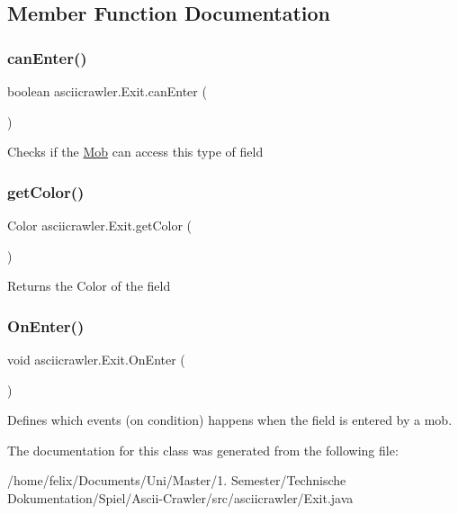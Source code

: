 \subsection{Member Function Documentation}
\mbox{\label{classasciicrawler_1_1Exit_a38b93acb30670f4f4ba1c3059e0bbfa0}} 
\subsubsection{\texorpdfstring{can\+Enter()}{canEnter()}}
{\footnotesize\ttfamily boolean asciicrawler.\+Exit.\+can\+Enter (\begin{DoxyParamCaption}{ }\end{DoxyParamCaption})\hspace{0.3cm}{\ttfamily [inline]}}

Checks if the \hyperlink{classasciicrawler_1_1Mob}{Mob} can access this type of field \mbox{\label{classasciicrawler_1_1Exit_a846df814b72bfab477c524427570d0cd}} 
\subsubsection{\texorpdfstring{get\+Color()}{getColor()}}
{\footnotesize\ttfamily Color asciicrawler.\+Exit.\+get\+Color (\begin{DoxyParamCaption}{ }\end{DoxyParamCaption})\hspace{0.3cm}{\ttfamily [inline]}}

Returns the Color of the field \mbox{\label{classasciicrawler_1_1Exit_adaf13dd0b5f3bb6cf25230da9dc166bc}} 
\subsubsection{\texorpdfstring{On\+Enter()}{OnEnter()}}
{\footnotesize\ttfamily void asciicrawler.\+Exit.\+On\+Enter (\begin{DoxyParamCaption}{ }\end{DoxyParamCaption})\hspace{0.3cm}{\ttfamily [inline]}}

Defines which events (on condition) happens when the field is entered by a mob. 

The documentation for this class was generated from the following file\+:\begin{DoxyCompactItemize}
\item 
/home/felix/\+Documents/\+Uni/\+Master/1. Semester/\+Technische Dokumentation/\+Spiel/\+Ascii-\/\+Crawler/src/asciicrawler/Exit.\+java\end{DoxyCompactItemize}
